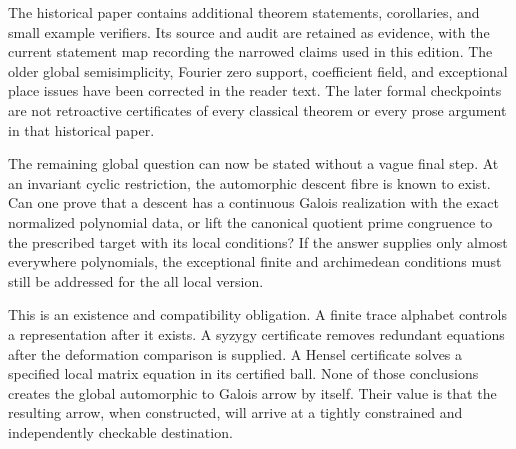 The historical paper contains additional theorem statements, corollaries, and small example verifiers. Its source and audit are retained as evidence, with the current statement map recording the narrowed claims used in this edition. The older global semisimplicity, Fourier zero support, coefficient field, and exceptional place issues have been corrected in the reader text. The later formal checkpoints are not retroactive certificates of every classical theorem or every prose argument in that historical paper.

The remaining global question can now be stated without a vague final step. At an invariant cyclic restriction, the automorphic descent fibre is known to exist. Can one prove that a descent has a continuous Galois realization with the exact normalized polynomial data, or lift the canonical quotient prime congruence to the prescribed target with its local conditions? If the answer supplies only almost everywhere polynomials, the exceptional finite and archimedean conditions must still be addressed for the all local version.

This is an existence and compatibility obligation. A finite trace alphabet controls a representation after it exists. A syzygy certificate removes redundant equations after the deformation comparison is supplied. A Hensel certificate solves a specified local matrix equation in its certified ball. None of those conclusions creates the global automorphic to Galois arrow by itself. Their value is that the resulting arrow, when constructed, will arrive at a tightly constrained and independently checkable destination.
